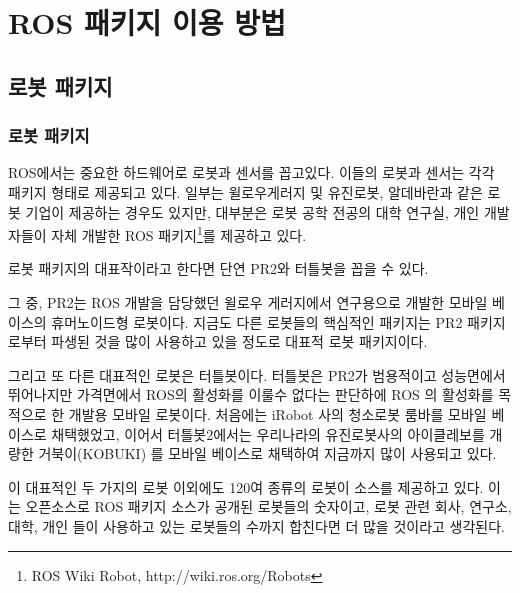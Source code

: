 
\chapter{ROS 패키지 이용 방법}

\section{로봇 패키지}

\subsection{로봇 패키지}

ROS에서는 중요한 하드웨어로 로봇과 센서를 꼽고있다. 이들의 로봇과 센서는 각각 패키지 형태로 제공되고 있다. 일부는 윌로우게러지 및 유진로봇, 알데바란과 같은 로봇 기업이 제공하는 경우도 있지만, 대부분은  로봇 공학 전공의 대학 연구실, 개인 개발자들이 자체 개발한 ROS 패키지\footnote{ROS Wiki Robot, http://wiki.ros.org/Robots}를 제공하고 있다. 

로봇 패키지의 대표작이라고 한다면 단연 PR2와 터틀봇을 꼽을 수 있다. 

그 중, PR2는 ROS 개발을 담당했던 윌로우 게러지에서 연구용으로 개발한 모바일 베이스의 휴머노이드형 로봇이다. 지금도 다른 로봇들의 핵심적인 패키지는 PR2 패키지로부터 파생된 것을 많이 사용하고 있을 정도로 대표적 로봇 패키지이다. 

그리고 또 다른 대표적인 로봇은 터틀봇이다. 터틀봇은 PR2가 범용적이고 성능면에서 뛰어나지만 가격면에서 ROS의 활성화를 이룰수 없다는 판단하에 ROS 의 활성화를 목적으로 한 개발용 모바일 로봇이다. 처음에는 iRobot 사의 청소로봇 룸바를 모바일 베이스로 채택했었고, 이어서 터틀봇2에서는 우리나라의 유진로봇사의 아이클레보를 개량한 거북이(KOBUKI) 를 모바일 베이스로 채택하여 지금까지 많이 사용되고 있다.

\vspace{\baselineskip}
\noindent
이 대표적인 두 가지의 로봇 이외에도 120여 종류의 로봇이 소스를 제공하고 있다.  이는 오픈소스로 ROS 패키지 소스가 공개된 로봇들의 숫자이고, 로봇 관련 회사, 연구소, 대학, 개인 들이 사용하고 있는 로봇들의 수까지 합친다면 더 많을 것이라고 생각된다.

